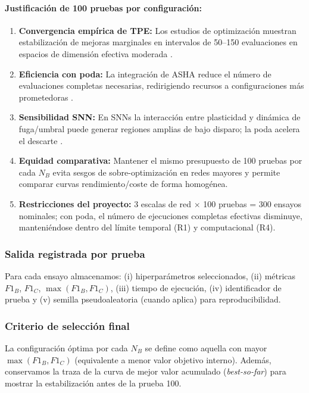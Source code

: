 \paragraph{Justificación de 100 pruebas por configuración:}
\begin{enumerate}
    \item \textbf{Convergencia empírica de TPE:} Los estudios de optimización muestran estabilización de mejoras marginales en intervalos de 50--150 evaluaciones en espacios de dimensión efectiva moderada \cite{bergstra_random_2012, akiba_optuna_2019}.
    \item \textbf{Eficiencia con poda:} La integración de ASHA reduce el número de evaluaciones completas necesarias, redirigiendo recursos a configuraciones más prometedoras \cite{li_system_2020, noauthor_efficient_2021}.
    \item \textbf{Sensibilidad SNN:} En SNNs la interacción entre plasticidad y dinámica de fuga/umbral puede generar regiones amplias de bajo disparo; la poda acelera el descarte \cite{firmin_parallel_2024, parsa_bayesian-based_2019}.
    \item \textbf{Equidad comparativa:} Mantener el mismo presupuesto de 100 pruebas por cada $N_B$ evita sesgos de sobre-optimización en redes mayores y permite comparar curvas rendimiento/coste de forma homogénea.
    \item \textbf{Restricciones del proyecto:} 3 escalas de red $\times$ 100 pruebas = 300 ensayos nominales; con poda, el número de ejecuciones completas efectivas disminuye, manteniéndose dentro del límite temporal (R1) y computacional (R4).
\end{enumerate}

\subsubsection{Salida registrada por prueba}
Para cada ensayo almacenamos: (i) hiperparámetros seleccionados, (ii) métricas $F1_B$, $F1_C$, $\max(F1_B,F1_C)$, (iii) tiempo de ejecución, (iv) identificador de prueba y (v) semilla pseudoaleatoria (cuando aplica) para reproducibilidad.

\subsubsection{Criterio de selección final}
La configuración óptima por cada $N_B$ se define como aquella con mayor $\max(F1_B,F1_C)$ (equivalente a menor valor objetivo interno). Además, conservamos la traza de la curva de mejor valor acumulado (\emph{best-so-far}) para mostrar la estabilización antes de la prueba 100.

